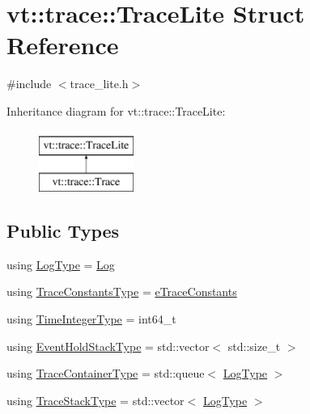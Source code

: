 \hypertarget{structvt_1_1trace_1_1_trace_lite}{}\section{vt\+:\+:trace\+:\+:Trace\+Lite Struct Reference}
\label{structvt_1_1trace_1_1_trace_lite}


{\ttfamily \#include $<$trace\+\_\+lite.\+h$>$}

Inheritance diagram for vt\+:\+:trace\+:\+:Trace\+Lite\+:\begin{figure}[H]
\begin{center}
\leavevmode
\includegraphics[height=2.000000cm]{structvt_1_1trace_1_1_trace_lite}
\end{center}
\end{figure}
\subsection*{Public Types}
\begin{DoxyCompactItemize}
\item 
using \hyperlink{structvt_1_1trace_1_1_trace_lite_aeb73e523d31829d3163c877b145afa2a}{Log\+Type} = \hyperlink{structvt_1_1trace_1_1_log}{Log}
\item 
using \hyperlink{structvt_1_1trace_1_1_trace_lite_a55bd5754c9786ae91a33bcf57f32acc8}{Trace\+Constants\+Type} = \hyperlink{namespacevt_1_1trace_acf454dfbd581b0ebae895f90b5927a1d}{e\+Trace\+Constants}
\item 
using \hyperlink{structvt_1_1trace_1_1_trace_lite_a301955b0e2e8d76ca5974c10be8125c4}{Time\+Integer\+Type} = int64\+\_\+t
\item 
using \hyperlink{structvt_1_1trace_1_1_trace_lite_af9e05e83b3d0adfb9d45cf13c0bb7525}{Event\+Hold\+Stack\+Type} = std\+::vector$<$ std\+::size\+\_\+t $>$
\item 
using \hyperlink{structvt_1_1trace_1_1_trace_lite_a346a7751a544de425345a8983ed52146}{Trace\+Container\+Type} = std\+::queue$<$ \hyperlink{structvt_1_1trace_1_1_trace_lite_aeb73e523d31829d3163c877b145afa2a}{Log\+Type} $>$
\item 
using \hyperlink{structvt_1_1trace_1_1_trace_lite_ae827dd1c4f37ac2dbcb6f4898a664b99}{Trace\+Stack\+Type} = std\+::vector$<$ \hyperlink{structvt_1_1trace_1_1_trace_lite_aeb73e523d31829d3163c877b145afa2a}{Log\+Type} $>$
\end{DoxyCompactItemize}

